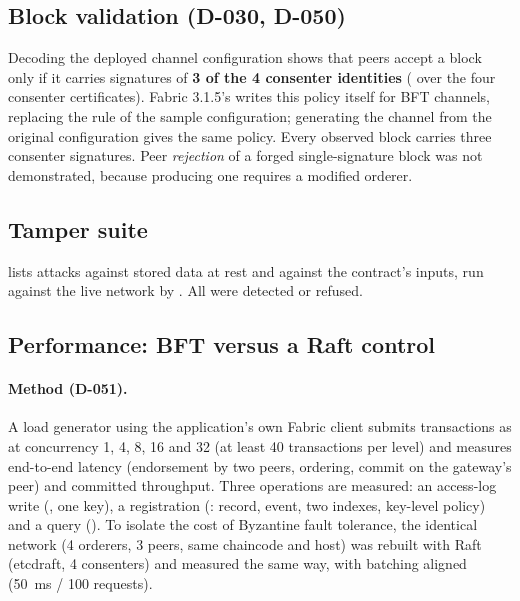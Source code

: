 \subsection{Block validation (D-030, D-050)}
Decoding the deployed channel configuration shows that peers accept a block only if it carries signatures of \textbf{3 of the 4 consenter identities} ( over the four consenter certificates). Fabric 3.1.5's  writes this policy itself for BFT channels, replacing the  rule of the sample configuration; generating the channel from the original configuration gives the same policy. Every observed block carries three consenter signatures. Peer \emph{rejection} of a forged single-signature block was not demonstrated, because producing one requires a modified orderer.

\subsection{Tamper suite}
 lists attacks against stored data at rest and against the contract's inputs, run against the live network by . All were detected or refused.
{\small

}

\subsection{Performance: BFT versus a Raft control}
\label{sec:bench}
\paragraph{Method (D-051).} A load generator using the application's own Fabric client submits transactions as  at concurrency 1, 4, 8, 16 and 32 (at least 40 transactions per level) and measures end-to-end latency (endorsement by two peers, ordering, commit on the gateway's peer) and committed throughput. Three operations are measured: an access-log write (, one key), a registration (: record, event, two indexes, key-level policy) and a query (). To isolate the cost of Byzantine fault tolerance, the identical network (4 orderers, 3 peers, same chaincode and host) was rebuilt with Raft (etcdraft, 4 consenters) and measured the same way, with batching aligned (50~ms / 100 requests).



